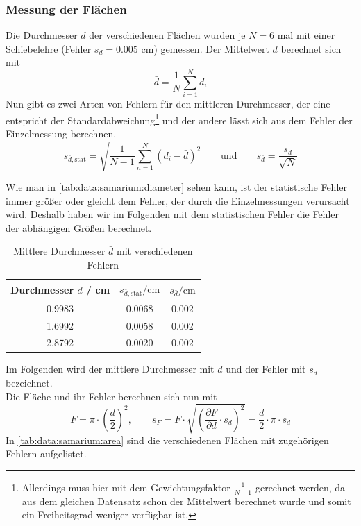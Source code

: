 \subsubsection{Messung der Flächen}
Die Durchmesser $d$ der verschiedenen Flächen wurden je $N = 6$ mal mit einer Schiebelehre (Fehler $s_d = 0.005$ cm) gemessen. Der Mittelwert $\bar{d}$ berechnet sich mit
\begin{equation}
  \bar{d} = \frac{1}{N} \sum_{i=1}^{N} d_i
\end{equation}
Nun gibt es zwei Arten von Fehlern für den mittleren Durchmesser, der eine entspricht der Standardabweichung\footnote{Allerdings muss hier mit 
dem Gewichtungsfaktor $\frac{1}{N-1}$ gerechnet werden, da aus dem gleichen Datensatz schon der Mittelwert berechnet wurde und somit ein Freiheitsgrad 
weniger verfügbar ist.} 
und der andere lässt sich aus dem Fehler der Einzelmessung berechnen.
\begin{equation}
  s_{\bar{d}, \text{stat}} = \sqrt{\frac{1}{N-1} \sum_{n=1}^{N} \left( d_i - \bar{d} \right)^2} \qquad \text{und} \qquad 
  s_{\bar{d}} = \frac{s_d}{\sqrt{N}} 
\end{equation}

Wie man in \autoref{tab:data:samarium:diameter} sehen kann, ist der statistische Fehler immer größer oder gleicht dem Fehler, der durch die Einzelmessungen 
verursacht wird. Deshalb haben wir im Folgenden mit dem statistischen Fehler die Fehler der abhängigen Größen berechnet.
\begin{table}[H]
\caption{Mittlere Durchmesser $\bar{d}$ mit verschiedenen Fehlern}
\begin{center}
\begin{tabular}{|c|c|c|}
  \hline
  \rule{0pt}{1em} Durchmesser $\bar{d}$ / cm & $s_{\bar{d}, \text{stat}} / \text{cm}$ & $s_{\bar{d}} / \text{cm}$  \\ \hline %
  0.9983 & 0.0068 & 0.002 \\ \hline
  1.6992 & 0.0058 & 0.002 \\ \hline
  2.8792 & 0.0020 & 0.002 \\ \hline
\end{tabular}
\end{center}
\label{tab:data:samarium:diameter}
\end{table}
Im Folgenden wird der mittlere Durchmesser mit $d$ und der Fehler mit $s_d$ bezeichnet.\\
Die Fläche und ihr Fehler berechnen sich nun mit
\begin{equation}
  F = \pi  \cdot \left( \frac{d}{2} \right)^2 , \qquad 
  s_F = F \cdot \sqrt{ \left( \frac{\partial F}{\partial d} \cdot s_d \right)^2 } = \frac{d}{2} \cdot \pi \cdot s_d
\end{equation}
In \autoref{tab:data:samarium:area} sind die verschiedenen Flächen mit zugehörigen Fehlern aufgelistet.

